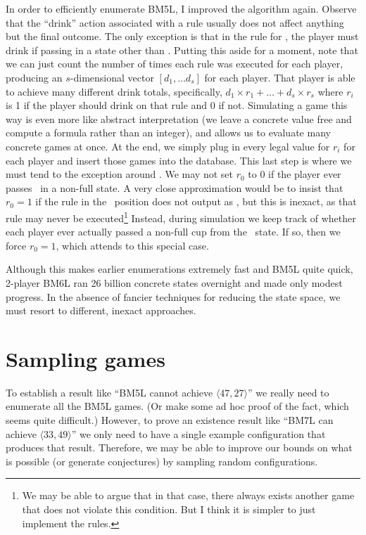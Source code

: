 \documentclass[twocolumn]{article}
\begin{document}
In order to efficiently enumerate BM5L, I improved the algorithm
again. Observe that the ``drink'' action associated with a rule
usually does not affect anything but the final outcome. The only
exception is that in the rule for \fullcup, the player must drink if
passing in a state other than \fullcup. Putting this aside for a
moment, note that we can just count the number of times each rule was
executed for each player, producing an $s$-dimensional vector $[ d_1,
  \ldots d_s ]$ for each player. That player is able to achieve many
different drink totals, specifically, $d_1 \times r_1 + \ldots + d_s
\times r_s$ where $r_i$ is 1 if the player should drink on that rule
and 0 if not. Simulating a game this way is even more like abstract
interpretation (we leave a concrete value free and compute a formula
rather than an integer), and allows us to evaluate many concrete games
at once. At the end, we simply plug in every legal value for $r_i$ for
each player and insert those games into the database. This last step
is where we must tend to the exception around \fullcup. We may not set
$r_0$ to 0 if the player ever passes \fullcup\ in a non-full state. A
very close approximation would be to insist that $r_0 = 1$ if the rule
in the \fullcup\ position does not output as \fullcup, but this is
inexact, as that rule may never be executed\footnote{We may be able to
  argue that in that case, there always exists another game that does
  not violate this condition. But I think it is simpler to just
  implement the rules.} Instead, during simulation we keep track of
whether each player ever actually passed a non-full cup from the
\fullcup\ state. If so, then we force $r_0 = 1$, which attends to this
special case. \label{sec:linear}

Although this makes earlier enumerations extremely fast and BM5L
quite quick, 2-player BM6L ran 26 billion concrete states overnight
and made only modest progress. In the absence of fancier techniques
for reducing the state space, we must resort to different, inexact
approaches.

\section{Sampling games}

To establish a result like ``BM5L cannot achieve $\langle 47, 27
\rangle$'' we really need to enumerate all the BM5L games. (Or make
some ad hoc proof of the fact, which seems quite difficult.) However,
to prove an existence result like ``BM7L can achieve $\langle 33, 49
\rangle$'' we only need to have a single example configuration that
produces that result. Therefore, we may be able to improve our bounds
on what is possible (or generate conjectures) by sampling random
configurations.
\end{document}
